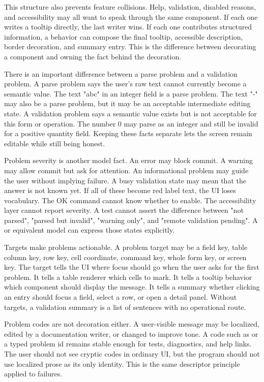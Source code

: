 This structure also prevents feature collisions. Help, validation, disabled reasons, and accessibility may all want to speak through the same component. If each one writes a tooltip directly, the last writer wins. If each one contributes structured information, a behavior can compose the final tooltip, accessible description, border decoration, and summary entry. This is the difference between decorating a component and owning the fact behind the decoration.

There is an important difference between a parse problem and a validation problem. A parse problem says the user's raw text cannot currently become a semantic value. The text "abc" in an integer field is a parse problem. The text "-" may also be a parse problem, but it may be an acceptable intermediate editing state. A validation problem says a semantic value exists but is not acceptable for this form or operation. The number 0 may parse as an integer and still be invalid for a positive quantity field. Keeping these facts separate lets the screen remain editable while still being honest.

Problem severity is another model fact. An error may block commit. A warning may allow commit but ask for attention. An informational problem may guide the user without implying failure. A busy validation state may mean that the answer is not known yet. If all of these become red label text, the UI loses vocabulary. The OK command cannot know whether to enable. The accessibility layer cannot report severity. A test cannot assert the difference between "not parsed", "parsed but invalid", "warning only", and "remote validation pending". A  or equivalent model can express those states explicitly.

Targets make problems actionable. A problem target may be a field key, table column key, row key, cell coordinate, command key, whole form key, or screen key. The target tells the UI where focus should go when the user asks for the first problem. It tells a table renderer which cells to mark. It tells a tooltip behavior which component should display the message. It tells a summary whether clicking an entry should focus a field, select a row, or open a detail panel. Without targets, a validation summary is a list of sentences with no operational route.

Problem codes are not decoration either. A user-visible message may be localized, edited by a documentation writer, or changed to improve tone. A code such as  or a typed problem id remains stable enough for tests, diagnostics, and help links. The user should not see cryptic codes in ordinary UI, but the program should not use localized prose as its only identity. This is the same descriptor principle applied to failures.

